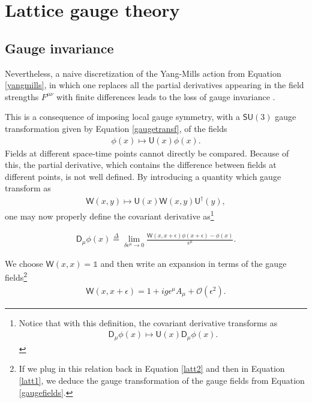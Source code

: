 \chapter{Lattice gauge theory}
\label{chap:latticeqcd}

\section{Gauge invariance} 
Nevertheless, a naive discretization of the Yang-Mills action from Equation \cref{yangmills}, in which one replaces all the partial derivatives appearing in the field strengths $F^{\mu\nu}$ with finite differences leads to the loss of gauge invariance \cite{schwartz, peskin}. 

\begin{remark}
This is a consequence of imposing local gauge symmetry, with a $\textsf{SU}(3)$ gauge transformation given by Equation \cref{gaugetransf}, of the fields
\begin{align*}
    \phi(x)\mapsto \textsf{U}(x)\phi(x).
\end{align*}
Fields at different space-time points cannot directly be compared. Because of this, the partial derivative, which contains the difference between fields at different points, is not well defined. By introducing a quantity which gauge transform as
\begin{align}\label{latt3}
    \textsf{W}(x,y)\mapsto\textsf{U}(x)\textsf{W}(x,y)\textsf{U}^\dagger(y),
\end{align}
one may now properly define the covariant derivative as\footnote{Notice that with this definition, the covariant derivative transforms as
\begin{align}\label{latt1}
    \textsf{D}_\mu\phi(x)\mapsto\textsf{U}(x)\textsf{D}_\mu\phi(x).
\end{align}
}

\begin{definition}
\begin{align}\label{latt2}
    \textsf{D}_{\mu} \phi(x)\overset{\Delta}{=} \lim _{\delta \epsilon^{\mu} \rightarrow 0} \frac{\textsf{W}(x, x+\epsilon) \phi(x+\epsilon)-\phi(x)}{\epsilon^\mu}.
\end{align}
\end{definition}
\noindent We choose $\textsf{W}(x,x)=\mathds{1}$ and then write an expansion in terms of the gauge fields\footnote{If we plug in this relation back in Equation \cref{latt2} and then in Equation \cref{latt1}, we deduce the gauge transformation of the gauge fields from Equation \cref{gaugefields}.}
\begin{align*}
    \textsf{W}(x,x+\epsilon)=1+ig\epsilon^\mu A_\mu+\mathcal{O}(\epsilon^2).
\end{align*}
\end{remark}


